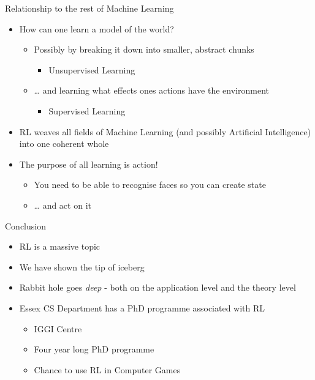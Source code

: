 \documentclass[]{beamer}
\providecommand{\tightlist}{%
  \setlength{\itemsep}{0pt}\setlength{\parskip}{0pt}}
\begin{document}
\begin{frame}{Relationship to the rest of Machine Learning}

\begin{itemize}
\tightlist
\item
  How can one learn a model of the world?

  \begin{itemize}
  \tightlist
  \item
    Possibly by breaking it down into smaller, abstract chunks

    \begin{itemize}
    \tightlist
    \item
      Unsupervised Learning
    \end{itemize}
  \item
    \ldots{} and learning what effects ones actions have the environment

    \begin{itemize}
    \tightlist
    \item
      Supervised Learning
    \end{itemize}
  \end{itemize}
\item
  RL weaves all fields of Machine Learning (and possibly Artificial
  Intelligence) into one coherent whole
\item
  The purpose of all learning is action!

  \begin{itemize}
  \tightlist
  \item
    You need to be able to recognise faces so you can create state
  \item
    \ldots{} and act on it
  \end{itemize}
\end{itemize}

\end{frame}

\begin{frame}{Conclusion}

\begin{itemize}
\tightlist
\item
  RL is a massive topic
\item
  We have shown the tip of iceberg
\item
  Rabbit hole goes \emph{deep} - both on the application level and the
  theory level
\item
  Essex CS Department has a PhD programme associated with RL

  \begin{itemize}
  \tightlist
  \item
    IGGI Centre
  \item
    Four year long PhD programme
  \item
    Chance to use RL in Computer Games
  \end{itemize}
\end{itemize}

\end{frame}
\end{document}
